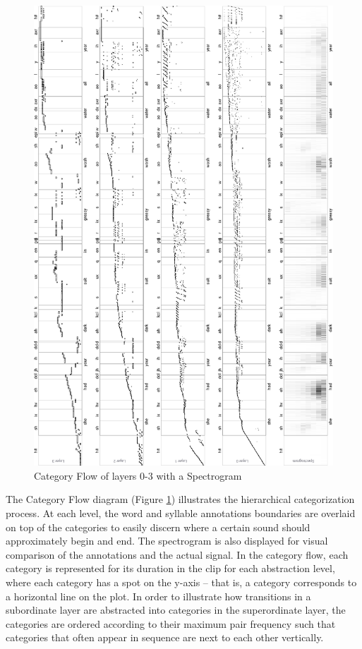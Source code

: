 \begin{figure}
  \centering
  \includegraphics[width=\linewidth]{fig/category-flow-90.pdf}
  \caption{Category Flow of layers 0-3 with a Spectrogram}
  \label{figure:category-flow}
\end{figure}

The Category Flow diagram (Figure \ref{figure:category-flow}) illustrates the hierarchical categorization process. At each level, the word and syllable annotations boundaries are overlaid on top of the categories to easily discern where a certain sound should approximately begin and end.  The spectrogram is also displayed for visual comparison of the annotations and the actual signal.  In the category flow, each category is represented for its duration in the clip for each abstraction level, where each category has a spot on the y-axis -- that is, a category corresponds to a horizontal line on the plot.  In order to illustrate how transitions in a subordinate layer are abstracted into categories in the superordinate layer, the categories are ordered according to their maximum pair frequency such that categories that often appear in sequence are next to each other vertically.

